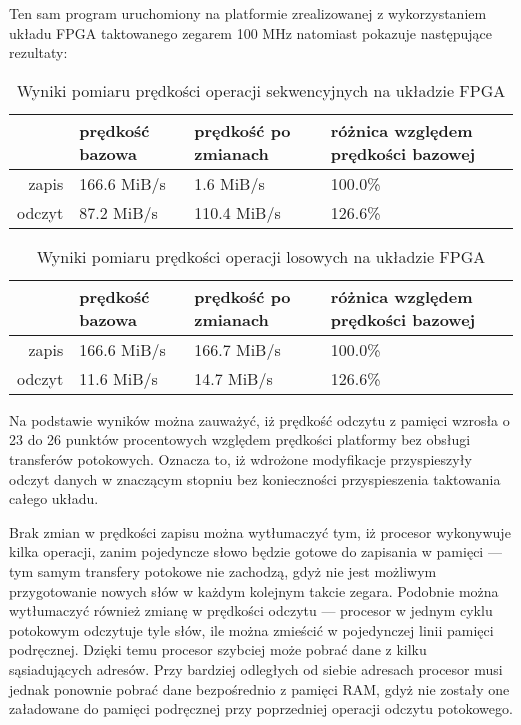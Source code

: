 Ten sam program uruchomiony na platformie zrealizowanej z wykorzystaniem układu FPGA taktowanego zegarem 100 MHz natomiast pokazuje następujące rezultaty:

\begin{table}[H]
\begin{center}
\begin{tabular}{ r|l|l|l| }
  & prędkość bazowa & prędkość po zmianach & różnica względem prędkości bazowej\\
 \hline
 zapis & 166.6 MiB/s & 1.6 MiB/s & 100.0\%\\
 odczyt & 87.2 MiB/s & 110.4 MiB/s & 126.6\%\\
 \hline
\end{tabular}
\end{center}
\caption{\label{tab:benchmark-seq-arty}Wyniki pomiaru prędkości operacji sekwencyjnych na układzie FPGA}
\end{table}

\begin{table}[H]
\begin{center}
\begin{tabular}{ r|l|l|l| }
  & prędkość bazowa & prędkość po zmianach & różnica względem prędkości bazowej\\
 \hline
 zapis & 166.6 MiB/s & 166.7 MiB/s & 100.0\%\\
 odczyt & 11.6 MiB/s & 14.7 MiB/s & 126.6\%\\
 \hline
\end{tabular}
\end{center}
\caption{\label{tab:benchmark-rnd-arty}Wyniki pomiaru prędkości operacji losowych na układzie FPGA}
\end{table}

Na podstawie wyników można zauważyć, iż prędkość odczytu z pamięci wzrosła o 23 do 26 punktów procentowych względem prędkości platformy bez obsługi transferów potokowych. Oznacza to, iż wdrożone modyfikacje przyspieszyły odczyt danych w znaczącym stopniu bez konieczności przyspieszenia taktowania całego układu.

Brak zmian w prędkości zapisu można wytłumaczyć tym, iż procesor wykonywuje kilka operacji, zanim pojedyncze słowo będzie gotowe do zapisania w pamięci --- tym samym transfery potokowe nie zachodzą, gdyż nie jest możliwym przygotowanie nowych słów w każdym kolejnym takcie zegara.
Podobnie można wytłumaczyć również zmianę w prędkości odczytu --- procesor w jednym cyklu potokowym odczytuje tyle słów, ile można zmieścić w pojedynczej linii pamięci podręcznej. Dzięki temu procesor szybciej może pobrać dane z kilku sąsiadujących adresów. Przy bardziej odległych od siebie adresach procesor musi jednak ponownie pobrać dane bezpośrednio z pamięci RAM, gdyż nie zostały one załadowane do pamięci podręcznej przy poprzedniej operacji odczytu potokowego.


